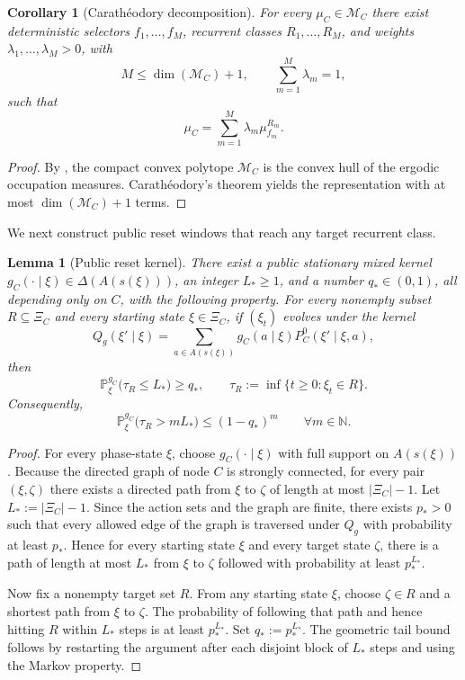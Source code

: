 \documentclass[12pt]{article}
\newtheorem{lemma}[theorem]{Lemma}
\newtheorem{corollary}[theorem]{Corollary}
\theoremstyle{definition}
\newcommand{\N}{\mathbb{N}}
\newcommand{\Pb}{\mathbb{P}}
\newcommand{\1}{\mathbf{1}}
\newcommand{\cM}{\mathcal{M}}
\begin{document}
\begin{corollary}[Carath\'eodory decomposition]
\label{cor:Carath}
For every \(\mu_C\in \cM_C\) there exist deterministic selectors
\(f_1,\dots,f_M\), recurrent classes \(R_1,\dots,R_M\), and weights
\(\lambda_1,\dots,\lambda_M>0\), with
\[
M\le \dim(\cM_C)+1,\qquad \sum_{m=1}^M\lambda_m=1,
\]
such that
\[
\mu_C=\sum_{m=1}^M \lambda_m \mu_{f_m}^{R_m}.
\]
\end{corollary}

\begin{proof}
By , the compact convex polytope \(\cM_C\) is
the convex hull of the ergodic occupation measures.  Carath\'eodory's theorem yields the
representation with at most \(\dim(\cM_C)+1\) terms.
\end{proof}

We next construct public reset windows that reach any target recurrent class.

\begin{lemma}[Public reset kernel]
\label{lem:reset2}
There exist a public stationary mixed kernel
\(g_C(\cdot\mid \xi)\in \Delta(A(s(\xi)))\), an integer \(L_*\ge 1\), and a number
\(q_*\in (0,1)\), all depending only on \(C\), with the following property.
For every nonempty subset \(R\subseteq \Xi_C\) and every starting state \(\xi\in \Xi_C\),
if \((\xi_t)\) evolves under the kernel
\[
Q_g(\xi'\mid \xi)
=
\sum_{a\in A(s(\xi))} g_C(a\mid \xi) P_C^0(\xi'\mid \xi,a),
\]
then
\[
\Pb_\xi^{g_C}\bigl(\tau_R\le L_*\bigr)\ge q_*,
\qquad
\tau_R:=\inf\{t\ge 0:\xi_t\in R\}.
\]
Consequently,
\[
\Pb_\xi^{g_C}\bigl(\tau_R>mL_*\bigr)\le (1-q_*)^m
\qquad \forall m\in \N.
\]
\end{lemma}

\begin{proof}
For every phase-state \(\xi\), choose \(g_C(\cdot\mid \xi)\) with full support on
\(A(s(\xi))\).  Because the directed graph of node \(C\) is strongly connected, for every
pair \((\xi,\zeta)\) there exists a directed path from \(\xi\) to \(\zeta\) of length at
most \(|\Xi_C|-1\).  Let \(L_*:=|\Xi_C|-1\).  Since the action sets and the graph are
finite, there exists \(p_*>0\) such that every allowed edge of the graph is traversed
under \(Q_g\) with probability at least \(p_*\).  Hence for every starting state \(\xi\)
and every target state \(\zeta\), there is a path of length at most \(L_*\) from \(\xi\)
to \(\zeta\) followed with probability at least \(p_*^{L_*}\).

Now fix a nonempty target set \(R\).  From any starting state \(\xi\), choose
\(\zeta\in R\) and a shortest path from \(\xi\) to \(\zeta\).  The probability of following
that path and hence hitting \(R\) within \(L_*\) steps is at least \(p_*^{L_*}\).  Set
\(q_*:=p_*^{L_*}\).  The geometric tail bound follows by restarting the argument after each
disjoint block of \(L_*\) steps and using the Markov property.
\end{proof}
\end{document}
